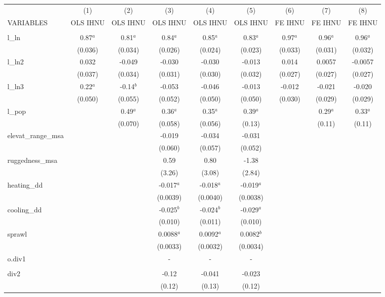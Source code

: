 \documentclass[]{article}
\begin{document}
\begin{tabular}{lcccccccc} \hline
 & (1) & (2) & (3) & (4) & (5) & (6) & (7) & (8) \\
VARIABLES & OLS IHNU & OLS IHNU & OLS IHNU & OLS IHNU & OLS IHNU & FE IHNU & FE IHNU & FE IHNU \\ \hline
 &  &  &  &  &  &  &  &  \\
l\_ln & 0.87$^a$ & 0.81$^a$ & 0.84$^a$ & 0.85$^a$ & 0.83$^a$ & 0.97$^a$ & 0.96$^a$ & 0.96$^a$ \\
 & (0.036) & (0.034) & (0.026) & (0.024) & (0.023) & (0.033) & (0.031) & (0.032) \\
l\_ln2 & 0.032 & -0.049 & -0.030 & -0.030 & -0.013 & 0.014 & 0.0057 & -0.0057 \\
 & (0.037) & (0.034) & (0.031) & (0.030) & (0.032) & (0.027) & (0.027) & (0.027) \\
l\_ln3 & 0.22$^a$ & -0.14$^b$ & -0.053 & -0.046 & -0.013 & -0.012 & -0.021 & -0.020 \\
 & (0.050) & (0.055) & (0.052) & (0.050) & (0.050) & (0.030) & (0.029) & (0.029) \\
l\_pop &  & 0.49$^a$ & 0.36$^a$ & 0.35$^a$ & 0.39$^a$ &  & 0.29$^a$ & 0.33$^a$ \\
 &  & (0.070) & (0.058) & (0.056) & (0.13) &  & (0.11) & (0.11) \\
elevat\_range\_msa &  &  & -0.019 & -0.034 & -0.031 &  &  &  \\
 &  &  & (0.060) & (0.057) & (0.052) &  &  &  \\
ruggedness\_msa &  &  & 0.59 & 0.80 & -1.38 &  &  &  \\
 &  &  & (3.26) & (3.08) & (2.84) &  &  &  \\
heating\_dd &  &  & -0.017$^a$ & -0.018$^a$ & -0.019$^a$ &  &  &  \\
 &  &  & (0.0039) & (0.0040) & (0.0038) &  &  &  \\
cooling\_dd &  &  & -0.025$^b$ & -0.024$^b$ & -0.029$^a$ &  &  &  \\
 &  &  & (0.010) & (0.011) & (0.010) &  &  &  \\
sprawl &  &  & 0.0088$^a$ & 0.0092$^a$ & 0.0082$^b$ &  &  &  \\
 &  &  & (0.0033) & (0.0032) & (0.0034) &  &  &  \\
o.div1 &  &  & - & - & - &  &  &  \\
 &  &  &  &  &  &  &  &  \\
div2 &  &  & -0.12 & -0.041 & -0.023 &  &  &  \\
 &  &  & (0.12) & (0.13) & (0.12) &  &  &  \\

\end{tabular}
\end{document}
